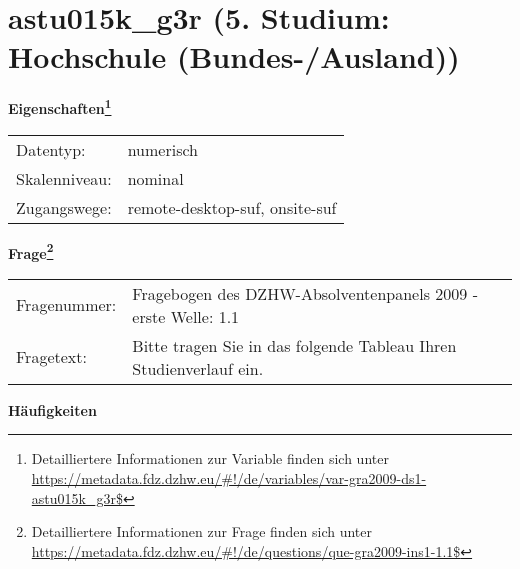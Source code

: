 
    \setcounter{footnote}{0}

    \vspace*{-1.8cm}
	\section{astu015k\_g3r (5. Studium: Hochschule (Bundes-/Ausland))}
	\label{section:astu015k_g3r}



    \vspace*{0.5cm}
    \noindent\textbf{Eigenschaften\footnote{Detailliertere Informationen zur Variable finden sich unter
		\url{https://metadata.fdz.dzhw.eu/\#!/de/variables/var-gra2009-ds1-astu015k_g3r$}}}\\
	\begin{tabularx}{\hsize}{@{}lX}
	Datentyp: & numerisch \\
	Skalenniveau: & nominal \\
	Zugangswege: &
	  remote-desktop-suf, 
	  onsite-suf
 \\
    \end{tabularx}



				\vspace*{0.5cm}
                \noindent\textbf{Frage\footnote{Detailliertere Informationen zur Frage finden sich unter
		              \url{https://metadata.fdz.dzhw.eu/\#!/de/questions/que-gra2009-ins1-1.1$}}}\\
				\begin{tabularx}{\hsize}{@{}lX}
					Fragenummer: &
					  Fragebogen des DZHW-Absolventenpanels 2009 - erste Welle:
					  1.1
 \\
					Fragetext: & Bitte tragen Sie in das folgende Tableau Ihren Studienverlauf ein. \\
				\end{tabularx}





        		\vspace*{0.5cm}
                \noindent\textbf{Häufigkeiten}

